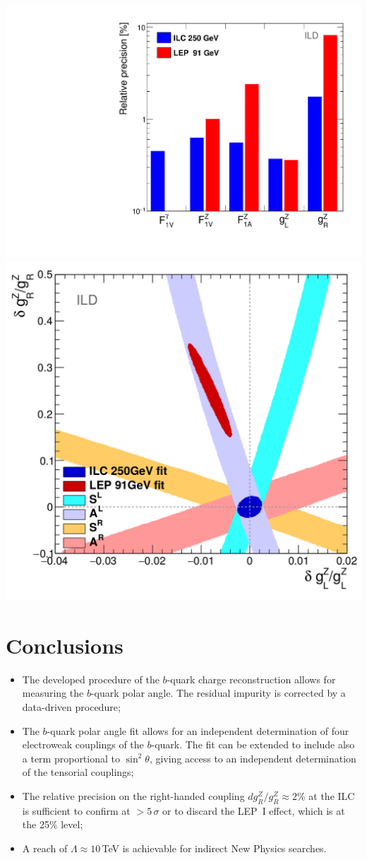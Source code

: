 \begin{center}
	\includegraphics[width=0.45\linewidth]{plots/final-graph-ild.pdf}
	\includegraphics[width=0.45\linewidth]{plots/ilc-precision-ild.png}
		\label{fig:LEPILCResult_3}
\end{center}\vspace{0.5cm}


\color{Blue} %

\section*{Conclusions}

\begin{itemize}
\item The developed procedure of the $b$-quark charge reconstruction allows for measuring the $b$-quark polar angle. The residual impurity is corrected by a data-driven procedure;
\item The $b$-quark polar angle fit allows for an independent determination of four electroweak couplings of the $b$-quark. The fit can be extended to include also a term proportional to $\sin^2\theta$, giving access to an independent determination of the tensorial couplings;
\item  The relative precision on the right-handed coupling $dg^Z_R/g^Z_R\approx 2$\% at the ILC is sufficient to confirm at $>5\,\sigma$ or to discard the LEP~I effect, which is at the 25\% level;
\item A reach of $\Lambda \approx 10$\,TeV is achievable for indirect New Physics searches.
\end{itemize}

